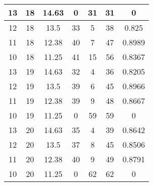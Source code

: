 \documentclass[letterpaper, 12pt]{article}
\begin{document}
\begin{longtable}{|c|c|c|c|c|c|c|}
\hline
13 & 18 & 14.63 & 0 & 31 & 31 & 0 \\
\hline
12 & 18 & 13.5 & 33 & 5 & 38 & 0.825 \\
\hline
11 & 18 & 12.38 & 40 & 7 & 47 & 0.8989 \\
\hline
10 & 18 & 11.25 & 41 & 15 & 56 & 0.8367 \\
\hline
13 & 19 & 14.63 & 32 & 4 & 36 & 0.8205 \\
\hline
12 & 19 & 13.5 & 39 & 6 & 45 & 0.8966 \\
\hline
11 & 19 & 12.38 & 39 & 9 & 48 & 0.8667 \\
\hline
10 & 19 & 11.25 & 0 & 59 & 59 & 0 \\
\hline
13 & 20 & 14.63 & 35 & 4 & 39 & 0.8642 \\
\hline
12 & 20 & 13.5 & 37 & 8 & 45 & 0.8506 \\
\hline
11 & 20 & 12.38 & 40 & 9 & 49 & 0.8791 \\
\hline
10 & 20 & 11.25 & 0 & 62 & 62 & 0 \\
\hline
\end{longtable}
\end{document}
